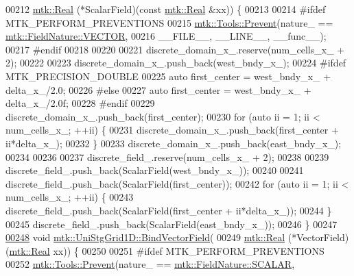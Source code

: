 \begin{DoxyCode}
00212     \hyperlink{group__c01-roots_gac080bbbf5cbb5502c9f00405f894857d}{mtk::Real} (*ScalarField)(\textcolor{keyword}{const} \hyperlink{group__c01-roots_gac080bbbf5cbb5502c9f00405f894857d}{mtk::Real} &xx)) \{
00213 
00214 \textcolor{preprocessor}{  #ifdef MTK\_PERFORM\_PREVENTIONS}
00215   \hyperlink{classmtk_1_1Tools_a332324c6f25e66be9dff48c5987a3b9f}{mtk::Tools::Prevent}(nature\_ == \hyperlink{namespacemtk_ga4c54f2a329cfb4e56213b02a259d19e2a87752381b583740610f1dfeb07fdad7e}{mtk::FieldNature::VECTOR},
00216                       \_\_FILE\_\_, \_\_LINE\_\_, \_\_func\_\_);
00217 \textcolor{preprocessor}{  #endif}
00218 
00220 
00221   discrete\_domain\_x\_.reserve(num\_cells\_x\_ + 2);
00222 
00223   discrete\_domain\_x\_.push\_back(west\_bndy\_x\_);
00224 \textcolor{preprocessor}{  #ifdef MTK\_PRECISION\_DOUBLE}
00225   \textcolor{keyword}{auto} first\_center = west\_bndy\_x\_ + delta\_x\_/2.0;
00226 \textcolor{preprocessor}{  #else}
00227   \textcolor{keyword}{auto} first\_center = west\_bndy\_x\_ + delta\_x\_/2.0f;
00228 \textcolor{preprocessor}{  #endif}
00229   discrete\_domain\_x\_.push\_back(first\_center);
00230   \textcolor{keywordflow}{for} (\textcolor{keyword}{auto} ii = 1; ii < num\_cells\_x\_; ++ii) \{
00231     discrete\_domain\_x\_.push\_back(first\_center + ii*delta\_x\_);
00232   \}
00233   discrete\_domain\_x\_.push\_back(east\_bndy\_x\_);
00234 
00236 
00237   discrete\_field\_.reserve(num\_cells\_x\_ + 2);
00238 
00239   discrete\_field\_.push\_back(ScalarField(west\_bndy\_x\_));
00240 
00241   discrete\_field\_.push\_back(ScalarField(first\_center));
00242   \textcolor{keywordflow}{for} (\textcolor{keyword}{auto} ii = 1; ii < num\_cells\_x\_; ++ii) \{
00243     discrete\_field\_.push\_back(ScalarField(first\_center + ii*delta\_x\_));
00244   \}
00245   discrete\_field\_.push\_back(ScalarField(east\_bndy\_x\_));
00246 \}
00247 
\hypertarget{mtk__uni__stg__grid__1d_8cc_source_l00248}{}\hyperlink{classmtk_1_1UniStgGrid1D_a5703f1f875f52f6de8f7db5a6250fafa}{00248} \textcolor{keywordtype}{void} \hyperlink{classmtk_1_1UniStgGrid1D_a5703f1f875f52f6de8f7db5a6250fafa}{mtk::UniStgGrid1D::BindVectorField}(
00249     \hyperlink{group__c01-roots_gac080bbbf5cbb5502c9f00405f894857d}{mtk::Real} (*VectorField)(\hyperlink{group__c01-roots_gac080bbbf5cbb5502c9f00405f894857d}{mtk::Real} xx)) \{
00250 
00251 \textcolor{preprocessor}{  #ifdef MTK\_PERFORM\_PREVENTIONS}
00252   \hyperlink{classmtk_1_1Tools_a332324c6f25e66be9dff48c5987a3b9f}{mtk::Tools::Prevent}(nature\_ == \hyperlink{namespacemtk_ga4c54f2a329cfb4e56213b02a259d19e2a8f3d9a4b6a7b7f2c7afa61ca113d0db9}{mtk::FieldNature::SCALAR},

\end{DoxyCode}
